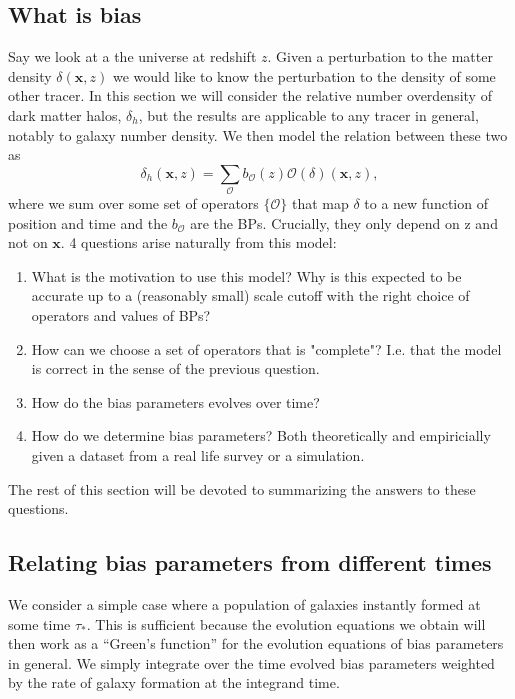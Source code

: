 \documentclass[11pt]{article}
\begin{document}
\subsection{What is bias}
Say we look at a the universe at redshift $z$. Given a perturbation to the matter density $\delta(\mathbf x, z)$ we would like to know the perturbation to the density of some other tracer. In this section we will consider the relative number overdensity of dark matter halos, $\delta_h$, but the results are applicable to any tracer in general, notably to galaxy number density. We then model the relation between these two as
\begin{equation}
    \delta_h(\mathbf x, z) = \sum_{\mathcal O} b_{\mathcal O}(z) \mathcal O(\delta)(\mathbf x, z),
\end{equation}
where we sum over some set of operators $\{\mathcal O\}$ that map $\delta$ to a new function of position and time and the $b_{\mathcal O}$ are the BPs. Crucially, they only depend on z and not on $\mathbf x$. 4 questions arise naturally from this model:
\begin{enumerate}
    \item What is the motivation to use this model? Why is this expected to be accurate up to a (reasonably small) scale cutoff with the right choice of operators and values of BPs?
    \item How can we choose a set of operators that is "complete"? I.e. that the model is correct in the sense of the previous question.
    \item How do the bias parameters evolves over time?
    \item How do we determine bias parameters? Both theoretically and empiricially given a dataset from a real life survey or a simulation.
\end{enumerate}
The rest of this section will be devoted to summarizing the answers to these questions.


\subsection{Relating bias parameters from different times}
We consider a simple case where a population of galaxies instantly formed at some time $\tau_*$. This is sufficient because the evolution equations we obtain will then work as a ``Green's function'' for the evolution equations of bias parameters in general. We simply integrate over the time evolved bias parameters weighted by the rate of galaxy formation at the integrand time.
\end{document}
